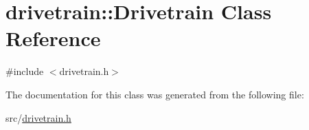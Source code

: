 \hypertarget{classdrivetrain_1_1Drivetrain}{}\section{drivetrain\+:\+:Drivetrain Class Reference}
\label{classdrivetrain_1_1Drivetrain}


{\ttfamily \#include $<$drivetrain.\+h$>$}



The documentation for this class was generated from the following file\+:\begin{DoxyCompactItemize}
\item 
src/\hyperlink{drivetrain_8h}{drivetrain.\+h}\end{DoxyCompactItemize}
